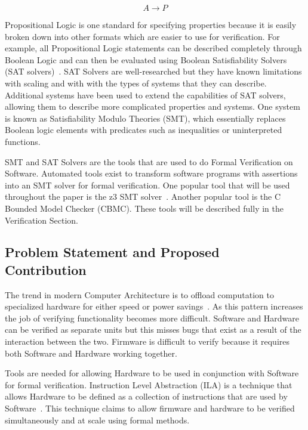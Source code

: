 \documentclass[../report.tex]{subfiles}
\begin{document}
\begin{equation}
    A \to P
\end{equation}

Propositional Logic is one standard for specifying properties because it is easily
broken down into other formats which are easier to use for verification.
For example, all Propositional Logic statements can be described completely
through Boolean Logic and can then be evaluated using Boolean Satisfiability
Solvers (SAT solvers)~\cite{validating-sat}. SAT Solvers are well-researched but
they have known limitations with scaling and with with the types of systems that
they can describe.
Additional systems have been used to extend the capabilities of SAT solvers, allowing them to describe more complicated properties and systems. 
One system is known as Satisfiability Modulo Theories (SMT), which essentially replaces Boolean logic elements with predicates such as inequalities or uninterpreted functions. 

SMT and SAT Solvers are the tools that are used to do Formal Verification
on Software. Automated tools exist to transform software programs with
assertions into an SMT solver for formal verification. 
One popular tool that will be used throughout the paper is the z3 SMT solver~\cite{z3-smt-solver}.
Another popular tool is the C Bounded Model Checker (CBMC). 
These tools will be described fully in the Verification Section. 


\subsection{Problem Statement and Proposed Contribution}

The trend in modern Computer Architecture is to offload computation to specialized hardware for either speed or power savings~\cite{hardware-accel}.
As this pattern increases the job of verifying functionality becomes more difficult.
Software and Hardware can be verified as separate units but this misses bugs
that exist as a result of the interaction between the two.
Firmware is difficult to verify because it requires both Software and Hardware
working together.

Tools are needed for allowing Hardware to be used in conjunction with Software for formal verification.
Instruction Level Abstraction (ILA) is a technique that allows Hardware to
be defined as a collection of instructions that are used by Software~\cite{ila}.
This technique claims to allow firmware and hardware to be verified simultaneously and at scale using formal methods.
\end{document}
